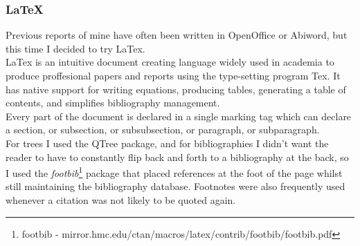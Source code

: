 \subsubsection{\LaTeX{}}
Previous reports of mine have often been written in OpenOffice or Abiword, but this time I decided to try LaTex.\\LaTex is an intuitive document creating language widely used in academia to produce proffesional papers and reports using the type-setting program Tex. It has native support for writing equations, producing tables, generating a table of contents, and simplifies bibliography management.\\Every part of the document is declared in a single marking tag which can declare a section, or subsection, or subsubsection, or paragraph, or subparagraph.
\\For trees I used the QTree package, and for bibliographies I didn't want the reader to have to constantly flip back and forth to a bibliography at the back, so I used the {\it footbib}\footnote{footbib - mirror.hmc.edu/ctan/macros/latex/contrib/footbib/footbib.pdf} package that placed references at the foot of the page whilst still maintaining the bibliography database. Footnotes were also frequently used whenever a citation was not likely to be quoted again.

%